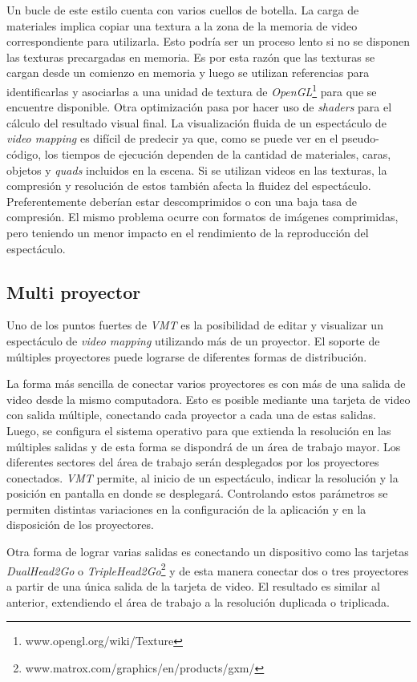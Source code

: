 Un bucle de este estilo cuenta con varios cuellos de botella.
La carga de materiales implica copiar una textura a la zona de la memoria de video correspondiente para utilizarla. Esto podría ser un proceso lento si no se disponen las texturas precargadas en memoria. Es por esta razón que las texturas se cargan desde un comienzo en memoria y luego se utilizan referencias para identificarlas y asociarlas a una unidad de textura de \emph{OpenGL}\footnote{www.opengl.org/wiki/Texture} para que se encuentre disponible.
Otra optimización pasa por hacer uso de \emph{shaders} para el cálculo del resultado visual final.
La visualización fluida de un espectáculo de \emph{video mapping} es difícil de predecir ya que, como se puede ver en el pseudo-código, los tiempos de ejecución dependen de la cantidad de materiales, caras, objetos y \emph{quads} incluidos en la escena.
Si se utilizan videos en las texturas, la compresión y resolución de estos también afecta la fluidez del espectáculo. Preferentemente deberían estar descomprimidos o con una baja tasa de compresión. El mismo problema ocurre con formatos de imágenes comprimidas, pero teniendo un menor impacto en el rendimiento de la reproducción del espectáculo.

\subsection{Multi proyector}

Uno de los puntos fuertes de \emph{VMT} es la posibilidad de editar y visualizar un espectáculo de \emph{video mapping} utilizando más de un proyector. El soporte de múltiples proyectores puede lograrse de diferentes formas de distribución.

La forma más sencilla de conectar varios proyectores es con más de una salida de video desde la mismo computadora. Esto es posible mediante una tarjeta de video con salida múltiple, conectando cada proyector a cada una de estas salidas. Luego, se configura el sistema operativo para que extienda la resolución en las múltiples salidas y de esta forma se dispondrá de un área de trabajo mayor. Los diferentes sectores del área de trabajo serán desplegados por los proyectores conectados.
\emph{VMT} permite, al inicio de un espectáculo, indicar la resolución y la posición en pantalla en donde se desplegará. Controlando estos parámetros se permiten distintas variaciones en la configuración de la aplicación y en la disposición de los proyectores.

Otra forma de lograr varias salidas es conectando un dispositivo como las tarjetas \emph{DualHead2Go} o \emph{TripleHead2Go}\footnote{www.matrox.com/graphics/en/products/gxm/} y de esta manera conectar dos o tres proyectores a partir de una única salida de la tarjeta de video. El resultado es similar al anterior, extendiendo el área de trabajo a la resolución duplicada o triplicada.

